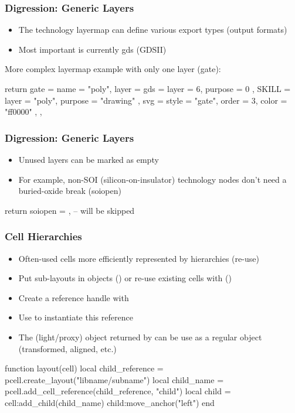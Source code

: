 \documentclass[aspectratio=169, dvipsnames, x11names, svgnames, 11pt]{beamer}
\begin{document}
\begin{frame}[fragile]
    \centering
    \frametitle{Digression: Generic Layers}
    \begin{itemize}
        \item The technology layermap can define various export types (output formats)
        \item Most important is currently gds (GDSII)
    \end{itemize}
    \vfill
    More complex layermap example with only one layer (gate):
    \begin{luacode}
        return {
            gate = {
                name = "poly",
                layer = {
                    gds = { layer = 6, purpose = 0 },
                    SKILL = { layer = "poly", purpose = "drawing" },
                    svg = { style = "gate", order = 3, color = "ff0000" },
                }
            },
        }
    \end{luacode}
\end{frame}

\begin{frame}[fragile]
    \centering
    \frametitle{Digression: Generic Layers}
    \begin{itemize}
        \item Unused layers can be marked as empty
        \item For example, non-SOI (silicon-on-insulator) technology nodes don't need a buried-oxide break (soiopen)
    \end{itemize}
    \vfill
    \begin{luacode}
        return {
            soiopen = {}, -- will be skipped
        }
    \end{luacode}
\end{frame}

\begin{frame}[fragile]
    \centering
    \frametitle{Cell Hierarchies}
    \begin{itemize}
        \item Often-used cells more efficiently represented by hierarchies (re-use)
        \item Put sub-layouts in objects () or re-use existing cells with ()
        \item Create a reference handle with 
        \item Use  to instantiate this reference
        \item The (light/proxy) object returned by  can be use as a regular object (transformed, aligned, etc.)
    \end{itemize}
    \vfill
    \begin{luacode}
        function layout(cell)
            local child_reference = pcell.create_layout("libname/subname")
            local child_name = pcell.add_cell_reference(child_reference,
                "child")
            local child = cell:add_child(child_name)
            child:move_anchor("left")
        end
    \end{luacode}
\end{frame}
\end{document}
